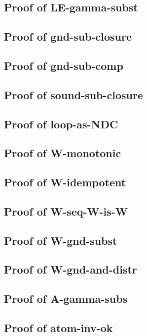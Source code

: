 \subsection{Proof of LE-gamma-subst}
\subsection{Proof of gnd-sub-closure}
\subsection{Proof of gnd-sub-comp}
\subsection{Proof of sound-sub-closure}
\subsection{Proof of loop-as-NDC}
\subsection{Proof of W-monotonic}
\subsection{Proof of W-idempotent}
\subsection{Proof of W-seq-W-is-W}
\subsection{Proof of W-gnd-subst}
\subsection{Proof of W-gnd-and-distr}
\subsection{Proof of A-gamma-subs}




\subsection{Proof of atom-inv-ok}


